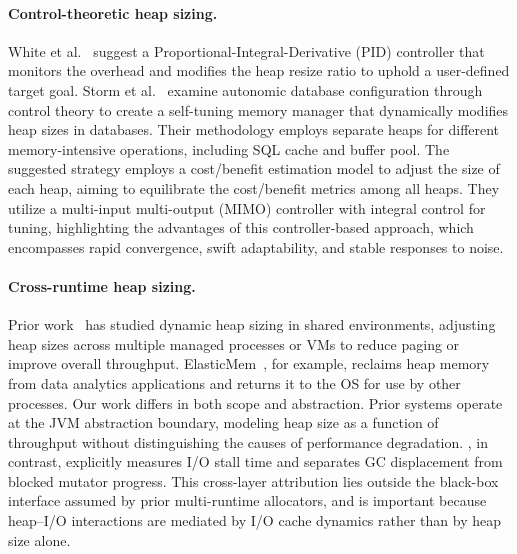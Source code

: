 \paragraph{\textbf{Control-theoretic heap sizing.}}
White et al.~\cite{white:pid} suggest a Proportional-Integral-Derivative (PID) controller that monitors the \flexheapGC{} overhead and modifies the heap resize ratio to uphold a user-defined target \flexheapGC{} goal.
%
Storm et al.~\cite{storm:db2} examine autonomic database configuration through control theory to create a self-tuning memory manager that dynamically modifies heap sizes in databases.
Their methodology employs separate heaps for different memory-intensive operations, including SQL cache and buffer pool.
The suggested strategy employs a cost/benefit estimation model to adjust the size of each heap, aiming to equilibrate the cost/benefit metrics among all heaps.
They utilize a multi-input multi-output (MIMO) controller with integral control for tuning, highlighting the advantages of this controller-based approach, which encompasses rapid convergence, swift adaptability, and stable responses to noise.

\paragraph{\textbf{Cross-runtime heap sizing.}}
Prior work~\cite{alonso:advisor,hertz:waste_not,cameron:forseti,wang:elasticMem} has studied dynamic heap sizing in shared environments, adjusting heap sizes across multiple managed processes or VMs to reduce paging or improve overall throughput.
ElasticMem~\cite{wang:elasticMem}, for example, reclaims heap memory from data analytics applications and returns it to the OS for use by other processes.
Our work differs in both scope and abstraction.
Prior systems operate at the JVM abstraction boundary, modeling heap size as a function of throughput without distinguishing the causes of performance degradation.
\flexheapName{}, in contrast, explicitly measures I/O stall time and separates GC displacement from blocked mutator progress.
This cross-layer attribution lies outside the black-box interface assumed by prior multi-runtime allocators, and is important because heap--I/O interactions are mediated by I/O cache dynamics rather than by heap size alone.

